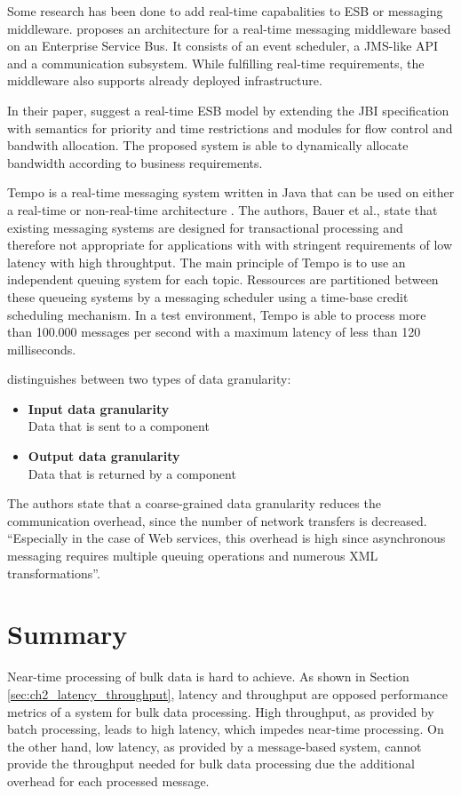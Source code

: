 Some research has been done to add real-time capabalities to ESB or messaging middleware. \cite{Garces-Erice:2009kx} proposes an architecture for a real-time messaging middleware based on an Enterprise Service Bus. It consists of an event scheduler, a \ac{JMS}-like API and a communication subsystem. While fulfilling real-time requirements, the middleware also supports already deployed infrastructure.

In their paper, \cite{Xia:2011rt} suggest a real-time ESB model by extending the JBI specification with semantics for priority and time restrictions and modules for flow control and bandwith allocation. The proposed system is able to dynamically allocate bandwidth according to business requirements.

Tempo is a real-time messaging system written in Java that can be used on either a real-time or non-real-time architecture \citep{Bauer:2008fk}. The authors, Bauer et al., state that existing messaging systems are designed for transactional processing and therefore not appropriate for applications with with stringent requirements of low latency with high throughtput. The main principle of Tempo is to use an independent queuing system for each topic. Ressources are partitioned between these queueing systems by a messaging scheduler using a time-base credit scheduling mechanism. In a test environment, Tempo is able to process more than 100.000 messages per second with a maximum latency of less than 120 milliseconds.

\cite{Haesen:2008ve} distinguishes between two types of data granularity:
\begin{itemize}
	\item \textbf{Input data granularity}\\
	Data that is sent to a component
	\item \textbf{Output data granularity}\\
	Data that is returned by a component
\end{itemize}
The authors state that a coarse-grained data granularity reduces the communication overhead, since the number of network transfers is decreased.
``Especially in the case of Web services, this overhead is high since asynchronous messaging requires multiple queuing operations and numerous XML transformations''.


\section{Summary}\label{sec:ch4_summary}
Near-time processing of bulk data is hard to achieve. As shown in Section \ref{sec:ch2_latency_throughput}, latency and throughput are opposed performance metrics of a system for bulk data processing. High throughput, as provided by batch processing, leads to high latency, which impedes near-time processing. On the other hand, low latency, as provided by a message-based system, cannot provide the throughput needed for bulk data processing due the additional overhead for each processed message.

